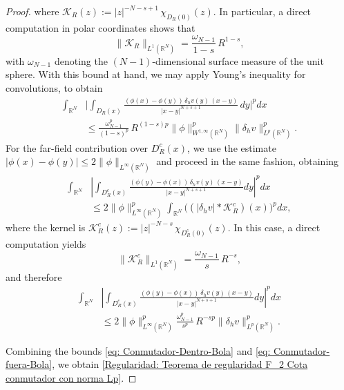\documentclass[]{amsart}
\theoremstyle{definition}
\theoremstyle{definition}
\theoremstyle{remark}
\numberwithin{equation}{section}
\begin{document}
\begin{proof}
where %
\(
\mathcal{K}_R(z) := |z|^{-N-s+1}\,\chi_{D_R(0)}(z).
\)
In particular, a direct computation in polar coordinates shows that
\[
\|\mathcal{K}_R\|_{L^1(\mathbb{R}^N)}
= \frac{\omega_{N-1}}{1-s}\, R^{1-s},
\]
with \(\omega_{N-1}\) denoting the \((N-1)\)-dimensional surface measure of the unit sphere. 
With this bound at hand, we may apply Young's inequality for convolutions, to obtain
\begin{align}
    \label{eq: Conmutador-Dentro-Bola}
    \int_{\mathbb{R}^N} &\Bigg|\int_{D_R(x)} 
\frac{(\phi(x)-\phi(y))\, \delta_h v(y) \,(x-y)}{|x-y|^{N+s+1}}\,dy\Bigg|^p dx \\
&\leq \frac{\omega^p_{N-1}}{(1-s)^{p}}\, R^{(1-s)p} \|\phi \|^{p}_{W^{1,\infty}(\mathbb{R}^N)}  \| \delta_h v \|^p_{L^{p}(\mathbb{R}^N)}.
\end{align}
For the far-field contribution over \( D_R^c(x) \), we use the estimate 
\( |\phi(x)- \phi(y)|\leq 2 \| \phi\|_{L^{\infty}(\mathbb{R}^N)}\) and proceed in the same fashion, obtaining
\begin{align*}
		\int_{\mathbb{R}^N}   & \left|\int_{D_R^c(x)} \frac{(\phi(y)-\phi(x))\, \delta_h v(y) \,(x-y)}{|x-y|^{N+s+1}} dy \right|^{p} dx \\
        &\leq 2\|\phi \|^{p}_{L^{\infty}(\mathbb{R}^N)} \int_{\mathbb{R}^N} \Big( (|\delta_h v| \ast \mathcal{K}^c_R)(x)\Big)^p dx, 
\end{align*}
where %
the kernel is
\(
\mathcal{K}^c_R(z) := |z|^{-N-s}\,\chi_{D_R^c(0)}(z).
\)
In this case, a direct computation yields
\[
\|\mathcal{K}^c_R\|_{L^1(\mathbb{R}^N)}
= \frac{\omega_{N-1}}{s}\, R^{-s},
\]	
and therefore
\begin{align}
     \label{eq: Conmutador-fuera-Bola}
    \int_{\mathbb{R}^N} &\left|\int_{D^c_R(x)} \frac{(\phi(y)-\phi(x))\, \delta_h v(y) \,(x-y)}{|x-y|^{N+s+1}} dy\right|^p dx \\&\leq  2\|\phi \|^{p}_{L^{\infty}(\mathbb{R}^N)}\frac{\omega_{N-1}^p}{s^p}\, R^{-sp} \| \delta_h v \|^p_{L^{p}(\mathbb{R}^N)}.
\end{align}


Combining the bounds \eqref{eq: Conmutador-Dentro-Bola} and \eqref{eq: Conmutador-fuera-Bola}, we obtain \eqref{Regularidad: Teorema de regularidad F_2 Cota conmutador con norma Lp}.
\end{proof}
\end{document}
